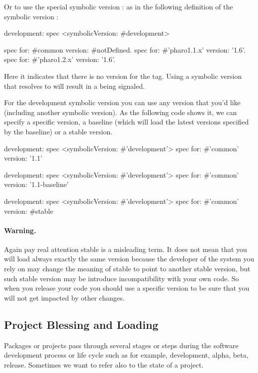 \documentclass[a4paper,10pt,twoside]{book}
\begin{document}
Or to use the special symbolic version : as in the following definition of the symbolic version :

\begin{code}{}
development: spec
       <symbolicVersion: #development>

       spec for: #common version: #notDefined.
       spec for: #'pharo1.1.x' version: '1.6'.
       spec for: #'pharo1.2.x' version: '1.6'.
\end{code}

Here it indicates that there is no version for the  tag.
Using a symbolic version that resolves to  will result in a  being signaled.



For the development symbolic version you can use any version that you'd like (including another symbolic version). As the following code shows it, we can specify a specific version, a baseline (which will load the latest versions specified by the baseline) or a stable version.

\begin{code}{}
development: spec
       <symbolicVersion: #'development'>
       spec for: #'common' version: '1.1'

development: spec
       <symbolicVersion: #'development'>
       spec for: #'common' version: '1.1-baseline'

development: spec
       <symbolicVersion: #'development'>
       spec for: #'common' version: #stable
\end{code}

\paragraph{Warning.} Again pay real attention stable is a misleading term. It does not mean that you will load always exactly the same version because the developer of the system you rely on may change the meaning of stable to point to another stable version, but such stable version may be introduce incompatibility with your own code. So when you release your code you should use a specific version to be sure that you will not get impacted by other changes. 

\subsection{Project Blessing and Loading}
Packages or projects pass through several stages or steps during the software development process or life cycle such as for example, development, alpha, beta, release. Sometimes we want to refer also to the state of a project.
\end{document}
